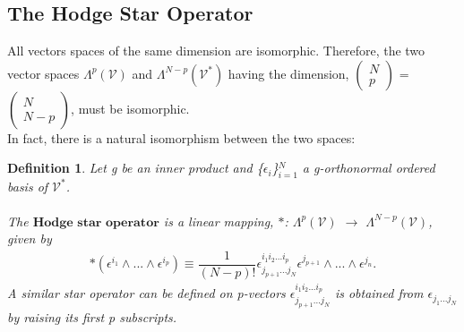 \documentclass[12pt,a4paper]{article}
\newtheorem{defn}[thm]{Definition}
\begin{document}
\subsection{The Hodge Star Operator}
All vectors spaces of the same dimension are isomorphic. Therefore, the two vector spaces $\Lambda^{p}(\mathcal{V})$ and $\Lambda^{N-p}(\mathcal{V}^*)$ having the dimension, $\begin{pmatrix}
N\\
p
\end{pmatrix}$ = $\begin{pmatrix}
N\\
N-p
\end{pmatrix}$, must be isomorphic. \\In fact, there is a natural isomorphism between the two spaces:
\begin{defn} \label{star}
Let g be an inner product and \{$\epsilon_i$\}$^N_{i=1}$  a g-orthonormal ordered basis of $\mathcal{V}^*$. \\\\The $\textbf{Hodge star operator}$ is a linear mapping, $\ast$: $\Lambda^{p}(\mathcal{V})$ $\to$ $\Lambda^{N-p}(\mathcal{V})$, given by
\begin{align*} 
\ast (\epsilon^{i_1} \wedge ... \wedge \epsilon^{i_p}) \equiv \dfrac{1}{(N - p)!} \epsilon^{i_1 i_2 ... i_p}_{j_{p+1}... j_N} \epsilon^{j_{p+1} }\wedge ... \wedge \epsilon^{j_n}.
\end{align*} 
A similar star operator can be defined on p-vectors $\epsilon^{i_1 i_2 ... i_p}_{j_{p+1}... j_N}$ is obtained
from $\epsilon_{j_1...j_N}$ by raising its first p subscripts.\\
\end{defn}
\end{document}
